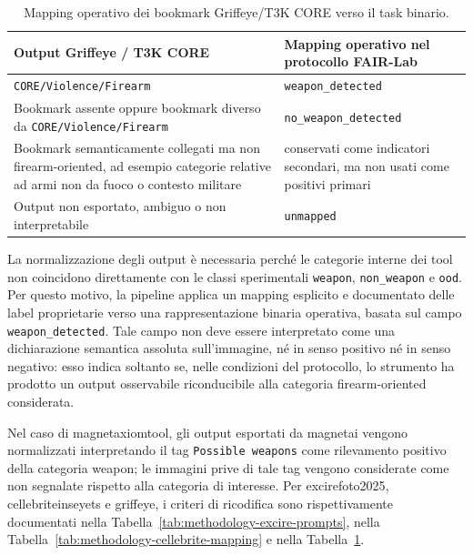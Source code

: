 \begin{table}[H]
\centering
\caption{Mapping operativo dei bookmark Griffeye/T3K CORE verso il task binario.}
\label{tab:methodology-griffeye-mapping}
\footnotesize
\renewcommand{\arraystretch}{1.15}
\begin{tabularx}{0.95\textwidth}{@{}p{}X@{}}
\toprule
\textbf{Output Griffeye / T3K CORE} &
\textbf{Mapping operativo nel protocollo FAIR-Lab} \\
\midrule
\texttt{CORE/Violence/Firearm}
& \texttt{weapon\_detected} \\
Bookmark assente oppure bookmark diverso da \texttt{CORE/Violence/Firearm}
& \texttt{no\_weapon\_detected} \\
Bookmark semanticamente collegati ma non firearm-oriented, ad esempio categorie
relative ad armi non da fuoco o contesto militare
& conservati come indicatori secondari, ma non usati come positivi primari \\
Output non esportato, ambiguo o non interpretabile
& \texttt{unmapped} \\
\bottomrule
\end{tabularx}
\end{table}


La normalizzazione degli output è necessaria perché le categorie interne dei tool non coincidono direttamente con le classi sperimentali \texttt{weapon}, \texttt{non\_weapon} e \texttt{ood}. Per questo motivo, la pipeline applica un mapping esplicito e documentato delle label proprietarie verso una rappresentazione binaria operativa, basata sul campo \texttt{weapon\_detected}. Tale campo non deve essere interpretato come una dichiarazione semantica assoluta sull'immagine, né in senso positivo né in senso negativo: esso indica soltanto se, nelle condizioni del protocollo, lo strumento ha prodotto un output osservabile riconducibile alla categoria firearm-oriented considerata.

Nel caso di \gls{magnetaxiomtool}, gli output esportati da \gls{magnetai}
vengono normalizzati interpretando il tag \texttt{Possible weapons} come
rilevamento positivo della categoria weapon; le immagini prive di tale tag
vengono considerate come non segnalate rispetto alla categoria di interesse.
Per \gls{excirefoto2025}, \gls{cellebriteinseyets} e \gls{griffeye}, i criteri
di ricodifica sono rispettivamente documentati nella
Tabella~\ref{tab:methodology-excire-prompts}, nella
Tabella~\ref{tab:methodology-cellebrite-mapping} e nella
Tabella~\ref{tab:methodology-griffeye-mapping}.

